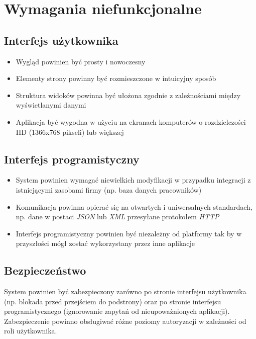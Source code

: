 \documentclass[eng,printmode,openany]{mgr}
\begin{document}
\section{Wymagania niefunkcjonalne}
\subsection{Interfejs użytkownika}
\begin{itemize}
	\item Wygląd powinien być prosty i nowoczesny
	\item Elementy strony powinny być rozmieszczone w intuicyjny sposób
	\item Struktura widoków powinna być ułożona zgodnie z zależnościami między wyświetlanymi danymi
	\item Aplikacja być wygodna w użyciu na ekranach komputerów o rozdzielczości HD (1366x768 pikseli) lub większej
\end{itemize}
\subsection{Interfejs programistyczny}
\begin{itemize}
	\item System powinien wymagać niewielkich modyfikacji w przypadku integracji z istniejącymi zasobami firmy (np. baza danych pracowników)
	\item Komunikacja powinna opierać się na otwartych i uniwersalnych standardach, np. dane w postaci \textit{JSON} lub \textit{XML} przesyłane protokołem \textit{HTTP}
	\item Interfejs programistyczny powinien być niezależny od platformy tak by w przyszłości mógł zostać wykorzystany przez inne aplikacje
\end{itemize}
\subsection{Bezpieczeństwo}
System powinien być zabezpieczony zarówno po stronie interfejsu użytkownika (np. blokada przed przejściem do podstrony) oraz po stronie interfejsu programistycznego (ignorowanie zapytań od nieupoważnionych aplikacji). Zabezpieczenie powinno obsługiwać różne poziomy autoryzacji w zależności od roli użytkownika.

\newpage
\end{document}
